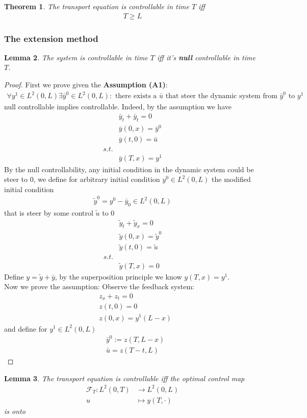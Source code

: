 \documentclass[a4paper,11pt,fleqn]{book}
\newtheorem{theorem}{Theorem}[section]
\newtheorem{lemma}[theorem]{Lemma}
\theoremstyle{definition}
\theoremstyle{remark}
\begin{document}
\begin{theorem}
	The transport equation is controllable in time $T$ iff
	\begin{align*}
		T \geq L
	\end{align*}
\end{theorem}

\subsubsection*{The extension method}
\begin{lemma}
	The system is controllable in time $T$ iff it's \textbf{null} controllable in time $T$. 
\end{lemma}
\begin{proof}
	First we prove given the \textbf{Assumption (A1)}:
	\begin{align*}
		\forall y^1 \in L^2(0, L) \exists \bar{y}^0 \in L^2(0, L): \text{ there exists a $\bar{u}$ that steer the dynamic system from $\bar{y}^0$ to $y^1$ }
	\end{align*}
	null controllable implies controllable. Indeed, by the assumption we have
	\begin{align*}
		& \bar{y}_t + \bar{y}_t = 0\\
		& \bar{y}(0, x) = \bar{y}^0 \\
		& \bar{y}(t, 0) = \bar{u}\\
		s.t.\\
		& \bar{y}(T, x) = y^1
	\end{align*}
	By the null controllability, any initial condition in the dynamic system could be steer to $0$, we define for arbitrary initial condition $y^0 \in L^2(0, L)$ the modified initial condition 
	\begin{align*}
		\tilde{y}^0 = y^0 - \bar{y}_0 \in L^2(0, L)
	\end{align*}
	that is steer by some control $\tilde{u}$ to $0$
	\begin{align*}
		& \tilde{y}_t + \tilde{y}_x = 0\\
		& \tilde{y}(0, x) = \tilde{y}^0\\
		& \tilde{y}(t, 0) = \tilde{u}\\
		s.t.\\
		& \tilde{y}(T, x) = 0
	\end{align*}
	Define $y = \tilde{y} + \bar{y}$, by the superposition principle we know $y(T, x) = y^1$. \\
	Now we prove the assumption:
	Observe the feedback system:
	\begin{align*}
		& z_x + z_t = 0\\
		& z(t, 0) = 0\\
		& z(0, x) = y^1(L - x)
	\end{align*}
	and define for $y^1 \in L^2(0, L)$ 
	\begin{align*}
		& \bar{y}^0 := z(T, L - x)\\
		& \bar{u} = z(T - t, L)
	\end{align*}
\end{proof}


\begin{lemma}
	The transport equation is controllable iff the optimal control map
	\begin{align*}
		\mathcal{F}_T: L^2(0, T) &\rightarrow L^2(0, L) \\
		u &\mapsto y(T, \cdot)
	\end{align*}
	is onto
\end{lemma}
\end{document}
